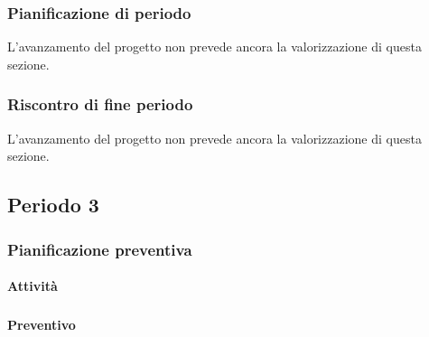 \subsubsection{Pianificazione di periodo}


L'avanzamento del progetto non prevede ancora la valorizzazione di questa sezione.



\subsubsection{Riscontro di fine periodo}

L'avanzamento del progetto non prevede ancora la valorizzazione di questa sezione.





\pagebreak
\subsection{Periodo 3}

\subsubsection{Pianificazione preventiva}

\paragraph{Attività}
\subparagraph*{}

\planningTable{
	
}

\paragraph{Preventivo}
\subparagraph*{}

